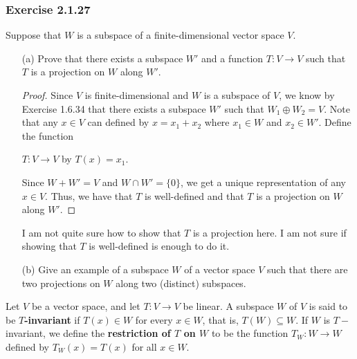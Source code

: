 \subsubsection{Exercise 2.1.27} Suppose that \( W  \) is a subspace of a finite-dimensional vector space \( V  \).
\begin{enumerate}
    \item[(a)] Prove that there exists a subspace \( W' \) and a function \( T: V \to V  \) such that \( T  \) is a projection on \( W  \) along \( W' \).
        \begin{proof}
        Since \( V  \) is finite-dimensional and \( W  \) is a subspace of \( V  \), we know by Exercise 1.6.34 that there exists a subspace \( W' \) such that \( W_{1} \oplus  W_{2} = V  \). Note that any \( x \in V  \) can defined by \( x = x_{1} + x_{2} \) where \( x_{1} \in W  \) and \( x_{2} \in W' \). Define the function 
        \begin{center}
            \( T: V \to V  \) by  \( T(x) = x_{1} \).
        \end{center} 
        Since \( W + W' = V  \) and \( W \cap W' = \{ 0  \}  \), we get a unique representation of any \( x \in V  \). Thus, we have that \( T \) is well-defined and that \( T  \) is a projection on \( W  \) along \( W' \). 
        \end{proof}
        \begin{remark}
           I am not quite sure how to show that \( T  \) is a projection here. I am not sure if showing that \( T  \) is well-defined is enough to do it.
        \end{remark}
    \item[(b)] Give an example of a subspace \( W  \) of a vector space \( V  \) such that there are two projections on \( W  \) along two (distinct) subspaces.
       \begin{solution}
       
       \end{solution} 
\end{enumerate}

\begin{definition}[Invariance]
    Let \( V  \) be a vector space, and let \( T: V \to V  \) be linear. A subspace \( W  \) of \( V  \) is said to be \textbf{\( T \)-invariant} if \( T(x) \in W  \) for every \( x \in W  \), that is, \( T(W) \subseteq W  \). If \( W  \) is  \( T- \)invariant, we define the \textbf{restriction of \( T \) on \( W  \)} to be the function \( T_{W} : W \to W  \) defined by \( T_{W}(x) = T(x) \) for all \( x \in W  \).
\end{definition}


